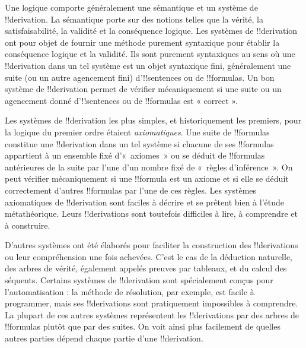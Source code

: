 \documentclass[11pt,a4paper,openany]{memoir}
\begin{document}
      {}
      {}


Une logique comporte généralement une sémantique et un système de
!!{derivation}. La sémantique porte sur des notions telles que la vérité,
la satisfaisabilité, la validité et la conséquence logique. Les systèmes
de !!{derivation} ont pour objet de fournir une méthode purement
syntaxique pour établir la conséquence logique et la validité. Ils sont
purement syntaxiques au sens où une !!{derivation} dans un tel système
est un objet syntaxique fini, généralement une suite (ou un autre
agencement fini) d'!!{sentence}s ou de !!{formula}s. Un bon système de
!!{derivation} permet de vérifier mécaniquement si une suite ou un
agencement donné d'!!{sentence}s ou de !!{formula}s est « correct ».

Les systèmes de !!{derivation} les plus simples, et historiquement les
premiers, pour la logique du premier ordre étaient \emph{axiomatiques}.
Une suite de !!{formula}s constitue une !!{derivation} dans un tel
système si chacune de ses !!{formula}s appartient à un ensemble fixé
d'«~axiomes~» ou se déduit de !!{formula}s antérieures de la suite par
l'une d'un nombre fixé de «~règles d'inférence~». On peut vérifier
mécaniquement si une !!{formula} est un axiome et si elle se déduit
correctement d'autres !!{formula}s par l'une de ces règles. Les systèmes
axiomatiques de !!{derivation} sont faciles à décrire et se prêtent bien
à l'étude métathéorique. Leurs !!{derivation}s sont toutefois difficiles
à lire, à comprendre et à construire.

D'autres systèmes ont été élaborés pour faciliter la construction des
!!{derivation}s ou leur compréhension une fois achevées. C'est le cas de
la déduction naturelle, des arbres de vérité, également appelés preuves
par tableaux, et du calcul des séquents. Certains systèmes de
!!{derivation} sont spécialement conçus pour l'automatisation : la méthode
de résolution, par exemple, est facile à programmer, mais ses
!!{derivation}s sont pratiquement impossibles à comprendre. La plupart
de ces autres systèmes représentent les !!{derivation}s par des arbres
de !!{formula}s plutôt que par des suites. On voit ainsi plus facilement
de quelles autres parties dépend chaque partie d'une !!{derivation}.
\end{document}

